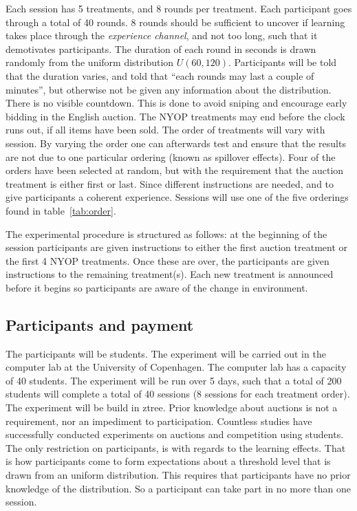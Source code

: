 \documentclass[a4paper,12pt]{article}
\begin{document}
	Each session has 5 treatments, and 8 rounds per treatment. Each participant goes through a total of 40 rounds. 8 rounds should be sufficient to uncover if learning takes place through the \emph{experience channel}, and not too long, such that it demotivates participants. The duration of each round in seconds is drawn randomly from the uniform distribution $U(60, 120)$. Participants will be told that the duration varies, and told that ``each rounds may last a couple of minutes'', but otherwise not be given any information about the distribution. There is no visible countdown. This is done to avoid sniping and encourage early bidding in the English auction. The NYOP treatments may end before the clock runs out, if all items have been sold. The order of treatments will vary with session. By varying the order one can afterwards test and ensure that the results are not due to one particular ordering (known as spillover effects). Four of the orders have been selected at random, but with the requirement that the auction treatment is either first or last. Since different instructions are needed, and to give participants a coherent experience. Sessions will use one of the five orderings found in table~\ref{tab:order}.
	
	The experimental procedure is structured as follows: at the beginning of the session participants are given instructions to either the first auction treatment or the first 4 NYOP treatments. Once these are over, the participants are given instructions to the remaining treatment(s). Each new treatment is announced before it begins so participants are aware of the change in environment. %

	\subsection{Participants and payment}
	\label{sec:participants-payment}
	The participants will be students. The experiment will be carried out in the computer lab at the University of Copenhagen. The computer lab has a capacity of 40 students. The experiment will be run over 5 days, such that a total of 200 students will complete a total of 40 sessions (8 sessions for each treatment order). The experiment will be build in ztree. Prior knowledge about auctions is not a requirement, nor an impediment to participation. Countless studies have successfully conducted experiments on auctions and competition using students. The only restriction on participants, is with regards to the learning effects. That is how participants come to form expectations about a threshold level that is drawn from an uniform distribution. This requires that participants have no prior knowledge of the distribution. So a participant can take part in no more than one session.
	
\end{document}
